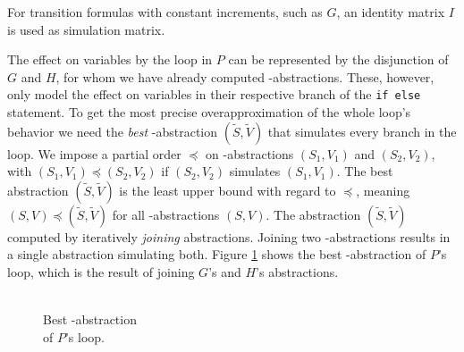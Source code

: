 For transition formulas with constant increments, such as $G$, an identity matrix $I$ is used as simulation matrix. \par
The effect on variables by the loop in $P$ can be represented by the disjunction of $G$ and $H$, for whom we have already computed \qvasr-abstractions. These, however, only model the effect on variables in their respective branch of the \texttt{if else} statement. To get the most precise overapproximation of the whole loop's behavior we need the \textsl{best} \qvasr-abstraction $(\tilde{S}, \tilde{V})$ that simulates every branch in the loop.
We impose a partial order $\preceq$ on \qvasr-abstractions $(S_1, V_1)$ and $(S_2, V_2)$, with $(S_1, V_1) \preceq (S_2, V_2)$ if $(S_2, V_2)$ simulates $(S_1, V_1)$. The best abstraction $(\tilde{S}, \tilde{V})$ is the least upper bound with regard to $\preceq$, meaning $(S, V) \preceq (\tilde{S}, \tilde{V})$ for all \qvasr-abstractions $(S, V)$. The abstraction $(\tilde{S}, \tilde{V})$ computed by iteratively \textsl{joining} abstractions. Joining two \qvasr-abstractions results in a single abstraction simulating both. Figure \ref{vasr} shows the best \qvasr-abstraction of $P$'s loop, which is the result of joining $G$'s and $H$'s abstractions. \\
\begin{minipage}[t]{\textwidth} \centering
	\begin{figure}[H]
		
		\caption{\\ Best \qvasr-abstraction \\ of $P$'s loop.}
		\label{vasr}
	\end{figure}
\end{minipage}

